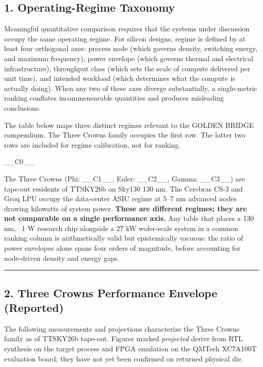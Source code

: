 
\subsection{1. Operating-Regime Taxonomy}

Meaningful quantitative comparison requires that the systems under discussion occupy the same operating regime. For silicon designs, regime is defined by at least four orthogonal axes: process node (which governs density, switching energy, and maximum frequency), power envelope (which governs thermal and electrical infrastructure), throughput class (which sets the scale of compute delivered per unit time), and intended workload (which determines what the compute is actually doing). When any two of these axes diverge substantially, a single-metric ranking conflates incommensurable quantities and produces misleading conclusions.

The table below maps three distinct regimes relevant to the GOLDEN BRIDGE compendium. The Three Crowns family occupies the first row. The latter two rows are included for regime calibration, not for ranking.

\_\_C0\_\_

The Three Crowns (Phi: \_\_C1\_\_, Euler: \_\_C2\_\_, Gamma: \_\_C3\_\_) are tape-out residents of TTSKY26b on Sky130 130 nm. The Cerebras CS-3 and Groq LPU occupy the data-center ASIC regime at 5--7 nm advanced nodes drawing kilowatts of system power. \textbf{These are different regimes; they are not comparable on a single performance axis.} Any table that places a 130 nm, ~1 W research chip alongside a 27 kW wafer-scale system in a common ranking column is arithmetically valid but epistemically vacuous: the ratio of power envelopes alone spans four orders of magnitude, before accounting for node-driven density and energy gaps.

\noindent\rule{\textwidth}{0.4pt}

\subsection{2. Three Crowns Performance Envelope (Reported)}

The following measurements and projections characterize the Three Crowns family as of TTSKY26b tape-out. Figures marked \textit{projected} derive from RTL synthesis on the target process and FPGA emulation on the QMTech XC7A100T evaluation board; they have not yet been confirmed on returned physical die.

